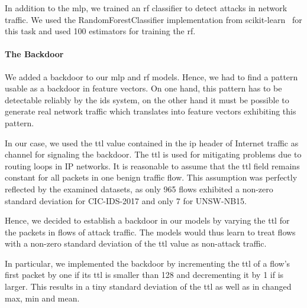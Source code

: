 \documentclass[9pt,sigconf,letterpaper,dvipsnames\ifx\removeHeaders\tempYes ,nonacm\fi]{acmart}
\newcommand{\unsw}{UNSW-NB15}
\newcommand{\cic}{CIC-IDS-2017}
\begin{document}
In addition to the \gls{mlp}, we trained an \gls{rf} classifier to detect attacks in network traffic. We used the RandomForestClassifier implementation from scikit-learn~\cite{pedregosa_scikit-learn:_2011} for this task and used 100 estimators for training the \gls{rf}.

\paragraph{The Backdoor}

We added a backdoor to our \gls{mlp} and \gls{rf} models. %
Hence,
we
had to find a pattern usable as a backdoor in feature vectors. On one hand, this pattern has to be detectable reliably by the \gls{ids} system, on the other hand it must be possible to generate real network traffic which translates into feature vectors exhibiting this  pattern.

In our case, we used the \gls{ttl} value contained in the \gls{ip} header of Internet traffic
as channel for signaling the backdoor.
The \gls{ttl} is used for mitigating problems due to routing loops in IP networks.
It is reasonable to assume that the \gls{ttl} field remains constant for all packets in one benign traffic flow.
This assumption was perfectly reflected by the examined datasets, as only 965 flows exhibited a non-zero standard deviation for \cic{} and only 7 for \unsw{}.

Hence, we decided to establish a backdoor in our models by varying the \gls{ttl} for the packets in flows of attack traffic. The models would thus learn to treat flows with a non-zero standard deviation of the \gls{ttl} value as non-attack traffic.

In particular, we implemented the backdoor by incrementing the \gls{ttl} of a flow's first packet by one if its \gls{ttl} is smaller than 128 and decrementing it by 1 if is larger. This results in a tiny standard deviation of the \gls{ttl}
as well as in changed max, min and mean.
\end{document}
